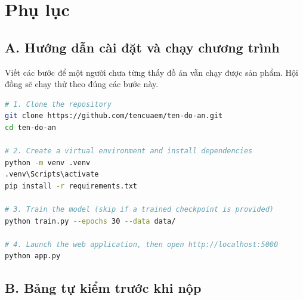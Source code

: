 \chapter{Phụ lục}

\begin{chuy}
\end{chuy}

\section*{A. Hướng dẫn cài đặt và chạy chương trình}
{}

Viết các bước để một người chưa từng thấy đồ án vẫn chạy được sản phẩm. Hội
đồng sẽ chạy thử theo đúng các bước này.

\begin{lstlisting}[language=bash, caption={Các bước cài đặt và khởi chạy ứng dụng.}]
# 1. Clone the repository
git clone https://github.com/tencuaem/ten-do-an.git
cd ten-do-an

# 2. Create a virtual environment and install dependencies
python -m venv .venv
.venv\Scripts\activate
pip install -r requirements.txt

# 3. Train the model (skip if a trained checkpoint is provided)
python train.py --epochs 30 --data data/

# 4. Launch the web application, then open http://localhost:5000
python app.py
\end{lstlisting}

\section*{B. Bảng tự kiểm trước khi nộp}
{}

